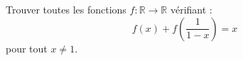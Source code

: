 Trouver toutes les fonctions $f : \mathbb{R} \to \mathbb{R}$ vérifiant :
\[
f(x) + f\left(\frac{1}{1-x}\right) = x
\]
pour tout $x \neq 1$.
